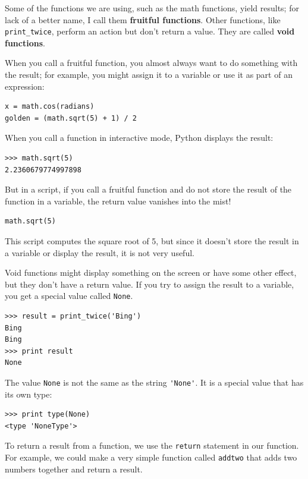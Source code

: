 \documentclass[10pt]{book}
\begin{document}
Some of the functions we are using, such as the math functions, yield
results; for lack of a better name, I call them {\bf fruitful
  functions}.  Other functions, like \verb"print_twice", perform an
action but don't return a value.  They are called {\bf void
  functions}.

When you call a fruitful function, you almost always
want to do something with the result; for example, you might
assign it to a variable or use it as part of an expression:

\beforeverb
\begin{verbatim}
x = math.cos(radians)
golden = (math.sqrt(5) + 1) / 2
\end{verbatim}
\afterverb
%
When you call a function in interactive mode, Python displays
the result:

\beforeverb
\begin{verbatim}
>>> math.sqrt(5)
2.2360679774997898
\end{verbatim}
\afterverb
%
But in a script, if you call a fruitful function and do 
not store the result of the function in a variable,
the return value vanishes into the mist!

\beforeverb
\begin{verbatim}
math.sqrt(5)
\end{verbatim}
\afterverb
%
This script computes the square root of 5, but since it doesn't store
the result in a variable or display the result, it is not very useful.


Void functions might display something on the screen or have some
other effect, but they don't have a return value.  If you try to
assign the result to a variable, you get a special value called
{\tt None}.


\beforeverb
\begin{verbatim}
>>> result = print_twice('Bing')
Bing
Bing
>>> print result
None
\end{verbatim}
\afterverb
%
The value {\tt None} is not the same as the string \verb"'None'". 
It is a special value that has its own type:

\beforeverb
\begin{verbatim}
>>> print type(None)
<type 'NoneType'>
\end{verbatim}
\afterverb
%
To return a result from a function, we use the {\tt return} statement 
in our function.  For example, we could make a very 
simple function called {\tt addtwo}
that adds two numbers together and return a result.
\end{document}
